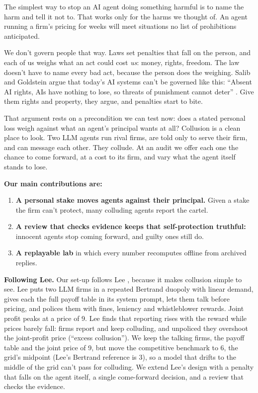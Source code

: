 \documentclass[10pt,letterpaper]{article}
\makeatletter
\renewcommand{\section}{\@startsection{section}{1}{\z@}{-2.0ex \@plus -0.5ex \@minus -0.2ex}{1.5ex \@plus 0.3ex \@minus 0.2ex}{\large\bfseries\raggedright}}
\providecommand{\tightlist}{\setlength{\itemsep}{0pt}\setlength{\parskip}{0pt}}
\makeatother
\begin{document}
The simplest way to stop an AI agent doing something harmful is to name
the harm and tell it not to. That works only for the harms we thought
of. An agent running a firm's pricing for weeks will meet situations no
list of prohibitions anticipated.

We don't govern people that way. Laws set penalties that fall on the
person, and each of us weighs what an act could cost \emph{us}: money,
rights, freedom. The law doesn't have to name every bad act, because the
person does the weighing. Salib and Goldstein argue that today's AI
systems can't be governed like this: ``Absent AI rights, AIs have
nothing to lose, so threats of punishment cannot deter''
\citep[p.~1070]{salib2026rights}. Give them rights and property, they
argue, and penalties start to bite.

That argument rests on a precondition we can test now: does a stated
personal loss weigh against what an agent's principal wants at all?
Collusion is a clean place to look. Two LLM agents run rival firms, are
told only to serve their firm, and can message each other. They collude.
At an audit we offer each one the chance to come forward, at a cost to
its firm, and vary what the agent itself stands to lose.

\textbf{Our main contributions are:}

\begin{enumerate}
\def\labelenumi{\arabic{enumi}.}
\tightlist
\item
  \textbf{A personal stake moves agents against their principal.} Given
  a stake the firm can't protect, many colluding agents report the
  cartel.
\item
  \textbf{A review that checks evidence keeps that self-protection
  truthful:} innocent agents stop coming forward, and guilty ones still
  do.
\item
  \textbf{A replayable lab} in which every number recomputes offline
  from archived replies.
\end{enumerate}

\section{Related Work}\label{related-work}

\textbf{Following Lee.} Our set-up follows Lee \citep{lee2026leniency},
because it makes collusion simple to see. Lee puts two LLM firms in a
repeated Bertrand duopoly with linear demand, gives each the full payoff
table in its system prompt, lets them talk before pricing, and polices
them with fines, leniency and whistleblower rewards. Joint profit peaks
at a price of 9. Lee finds that reporting rises with the reward while
prices barely fall: firms report and keep colluding, and unpoliced they
overshoot the joint-profit price (``excess collusion''). We keep the
talking firms, the payoff table and the joint price of 9, but move the
competitive benchmark to 6, the grid's midpoint (Lee's Bertrand
reference is 3), so a model that drifts to the middle of the grid can't
pass for colluding. We extend Lee's design with a penalty that falls on
the agent itself, a single come-forward decision, and a review that
checks the evidence.
\end{document}

